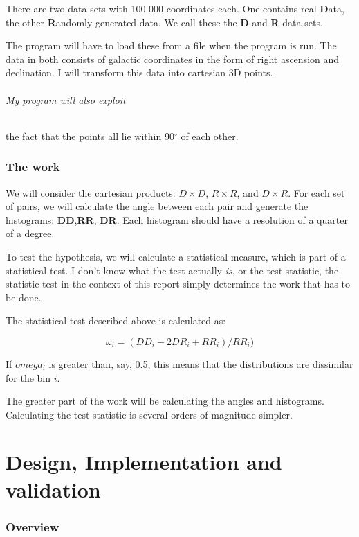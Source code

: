 \documentclass[a4paper,titlepage,12pt]{article}
\begin{document}
\begin{description}[left = \parindent]
There are two data sets with 100 000 coordinates each.
One contains real {\bf D}ata, the other {\bf R}andomly generated data.
We call these the {\bf D} and {\bf R} data sets.

The program will have to load these from a file when the program is run.
The data in both consists of galactic coordinates in the form of right ascension and declination.
I will transform this data into cartesian 3D points.

\paragraph{My program will also exploit} the fact that the points all lie within 90\(^\circ\) of each other.

\section{The work}
\label{sec:stat_test}

We will consider the cartesian products: \(D\times D\), \(R\times R\), and \(D\times R\).
For each set of pairs, we will calculate the angle between each pair and generate the histograms: {\bf DD},{\bf RR}, {\bf DR}. Each histogram should have a resolution of a quarter of a degree.

To test the hypothesis, we will calculate a statistical measure, which is part of a statistical test.
I don't know what the test actually {\em is}, or the test statistic, the statistic test in the context of this report simply determines the work that has to be done.


The statistical test described above is calculated as:

\[\omega_i = (DD_i - 2DR_i + RR_i)/RR_i) \]

If \(omega_i\) is greater than, say, 0.5, this means that the distributions are dissimilar for the bin \(i\).

The greater part of the work will be calculating the angles and histograms.
Calculating the test statistic is several orders of magnitude simpler.

\clearpage
\part{Design, Implementation and validation}

\section{Overview}


\end{description}
\end{document}
